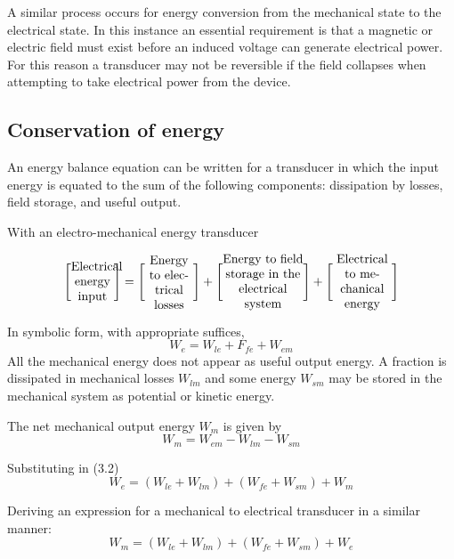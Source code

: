 \documentclass[a4paper,numbers=noenddot,12pt]{scrbook}
\begin{document}
A similar process occurs for energy conversion from the mechanical state to the electrical state. In this instance an essential requirement is that a magnetic or electric field must exist before an induced voltage can generate electrical power. For this reason a transducer may not be reversible if the field collapses when attempting to take electrical power from the device.

\subsection{Conservation of energy} An energy balance equation can be written for a transducer in which the input energy is equated to the sum of the following components: dissipation by losses, field storage, and useful output.

With an electro-mechanical energy transducer

\begin{equation}
    \Bigg[
        \parbox{8ex}{\centering Electrical energy input}
    \Bigg]
    =
    \Bigg[
        \parbox{9ex}{\centering Energy to electrical losses}
    \Bigg]
    +
    \Bigg[
        \parbox{15ex}{\centering Energy to field storage in the electrical system}
    \Bigg]
    +
    \Bigg[
        \parbox{11ex}{\centering Electrical to mechanical energy}
    \Bigg]
    \label{eq:Eq3.1}
\end{equation}

In symbolic form, with appropriate suffices,
\begin{equation}
    W_e = W_{le} + F_{fe} +W_{em}
    \label{eq:Eq3.2}
\end{equation}
All the mechanical energy does not appear as useful output energy. A fraction is dissipated in mechanical losses $W_{lm}$ and some energy $W_{sm}$ may be stored in the mechanical system as potential or kinetic energy.

The net mechanical output energy $W_m$ is given by
\begin{equation}
    W_m = W_{em} - W_{lm} -W_{sm}
    \label{eq:Eq3.3}
\end{equation}

Substituting in (3.2)
\begin{equation}
    W_e = (W_{le} + W_{lm}) + (W_{fe} + W_{sm}) + W_m
    \label{eq:Eq.3-4}
\end{equation}

Deriving an expression for a mechanical to electrical transducer in a similar manner:
\begin{equation}
    W_m = (W_{le} + W_{lm}) + (W_{fe} + W_{sm}) + W_e 
    \label{eq:Eq3.5}
\end{equation}
\end{document}
